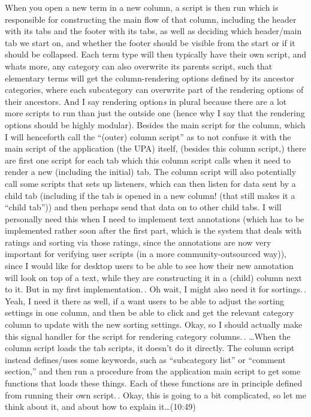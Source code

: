\documentclass{report}
\begin{document}
When you open a new term in a new column, a script is then run which is responsible for constructing the main flow of that column, including the header with its tabs and the footer with its tabs, as well as deciding which header/main tab we start on, and whether the footer should be visible from the start or if it should be collapsed. Each term type will then typically have their own script, and whats more, any category can also overwrite its parents script, such that elementary terms will get the column-rendering options defined by its ancestor categories, where each subcategory can overwrite part of the rendering options of their ancestors. And I say rendering option\emph{s} in plural because there are a lot more scripts to run than just the outside one (hence why I say that the rendering options should be highly modular). Besides the main script for the column, which I will henceforth call the ``(outer) column script'' as to not confuse it with the main script of the application (the UPA) itself, (besides this column script,) there are first one script for each tab which this column script calls when it need to render a new (including the initial) tab. The column script will also potentially call some scripts that sets up listeners, which can then listen for data sent by a child tab (including if the tab is opened in a new column! (that still makes it a ``child tab'')) and then perhaps send that data on to other child tabs. I will personally need this when I need to implement text annotations (which has to be implemented rather soon after the first part, which is the system that deals with ratings and sorting via those ratings, since the annotations are now very important for verifying user scripts (in a more community-outsourced way)), since I would like for desktop users to be able to see how their new annotation will look on top of a text, while they are constructing it in a (child) column next to it. But in my first implementation.\,. Oh wait, I might also need it for sortings.\,. Yeah, I need it there as well, if a want users to be able to adjust the sorting settings in one column, and then be able to click and get the relevant category column to update with the new sorting settings. Okay, so I should actually make this signal handler for the script for rendering category columns.\,. %
\ldots When the column script loads the tab scripts, it doesn't do it directly. The column script instead defines/uses some keywords, such as ``subcategory list'' or ``comment section,'' and then run a procedure from the application main script to get some functions that loads these things. Each of these functions are in principle defined from running their own script.\,. Okay, this is going to a bit complicated, so let me think about it, and about how to explain it\ldots (10:49)
\end{document}
